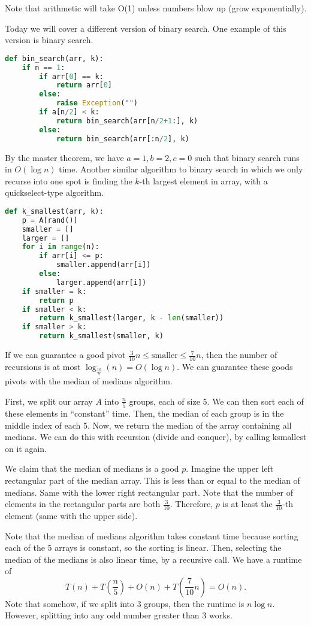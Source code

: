 
Note that arithmetic will take O(1) unless numbers blow up (grow exponentially).

Today we will cover a different version of binary search. One example of this version is binary search.

\begin{lstlisting}[language=Python]
def bin_search(arr, k):
	if n == 1:
		if arr[0] == k:
			return arr[0]
		else:
			raise Exception("")
		if a[n/2] < k:
			return bin_search(arr[n/2+1:], k)
		else:
			return bin_search(arr[:n/2], k)
\end{lstlisting}

By the master theorem, we have \( a=1, b=2, c=0 \) such that binary search runs in \( O(\log n) \) time. Another similar algorithm to binary search in which we only recurse into one spot is finding the \( k \)-th largest element in array, with a quickselect-type algorithm.

\begin{lstlisting}[language=Python]
def k_smallest(arr, k):
	p = A[rand()]
	smaller = []
	larger = []
	for i in range(n):
		if arr[i] <= p:
			smaller.append(arr[i])
		else:
			larger.append(arr[i])
	if smaller = k:
		return p
	if smaller < k:
		return k_smallest(larger, k - len(smaller))
	if smaller > k:
		return k_smallest(smaller, k)
\end{lstlisting}

If we can guarantee a good pivot \( \frac{3}{10}n \le \text{smaller} \le \frac{7}{10}n \), then the number of recursions is at most \( \log _{\frac{10}{7}}(n) = O(\log n) \). We can guarantee these goods pivots with the median of medians algorithm.

First, we split our array \( A \) into \( \frac{n}{5} \) groups, each of size 5. We can then sort each of these elements in ``constant'' time. Then, the median of each group is in the middle index of each 5. Now, we return the median of the array containing all medians. We can do this with recursion (divide and conquer), by calling ksmallest on it again.

We claim that the median of medians is a good \( p \). Imagine the upper left rectangular part of the median array. This is less than or equal to the median of medians. Same with the lower right rectangular part. Note that the number of elements in the rectangular parts are both \( \frac{3}{10} \). Therefore, \( p \) is at least the \( \frac{3}{10} \)-th element (same with the upper side).

Note that the median of medians algorithm takes constant time because sorting each of the 5 arrays is constant, so the sorting is linear. Then, selecting the median of the medians is also linear time, by a recursive call. We have a runtime of \[
	T(n) + T\left(\frac{n}{5}\right) + O(n) + T\left(\frac{7}{10}n\right) = O(n)
.\] Note that somehow, if we split into 3 groups, then the runtime is \( n\log n \). However, splitting into any odd number greater than 3 works.
